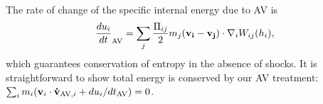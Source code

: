 \documentclass[onecolumn,floatfix]{emulateapj}
\begin{document}
The rate of change of the specific internal energy due to AV is
\begin{equation}
  {du_i\over dt}_{\rm AV} = 
  \sum_j \frac{\Pi_{ij}}{2}  m_j ({\bf v_i}-{\bf v_j})\cdot  
\nabla_iW_{ij}(h_i),
  \label{eq:dudtAV}
\end{equation}
which guarantees conservation of entropy in the
absence of shocks.
It is
straightforward to show total energy is conserved by our AV
treatment: $\sum_i m_i({\bf v}_i\cdot{\bf \dot v}_{{\rm AV},i}
+du_i/dt_{\rm AV})=0$.
\end{document}

